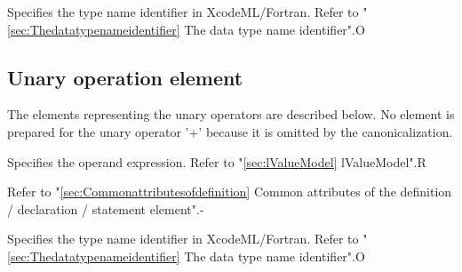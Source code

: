 \begin{XcodeMLAttributes}
{Specifies the type name identifier in XcodeML/Fortran.
 Refer to "\ref{sec:Thedatatypenameidentifier} The data type name identifier".}{O}
\end{XcodeMLAttributes}


\subsection{Unary operation element}

The elements representing the unary operators are described below.
No element is prepared for the unary operator '+' because it is omitted by the canonicalization.
\newline

\begin{XcodeMLOperations}
\end{XcodeMLOperations}


\begin{XcodeMLChildElements}
{Specifies the operand expression. Refer to "\ref{sec:lValueModel} lValueModel".}{R}
\end{XcodeMLChildElements}

\begin{XcodeMLAttributes}
{Refer to "\ref{sec:Commonattributesofdefinition} Common attributes of the definition / declaration / statement element".}{-}
\end{XcodeMLAttributes}

\begin{XcodeMLAttributes}
{Specifies the type name identifier in XcodeML/Fortran.
 Refer to "\ref{sec:Thedatatypenameidentifier} The data type name identifier".}{O}
\end{XcodeMLAttributes}


